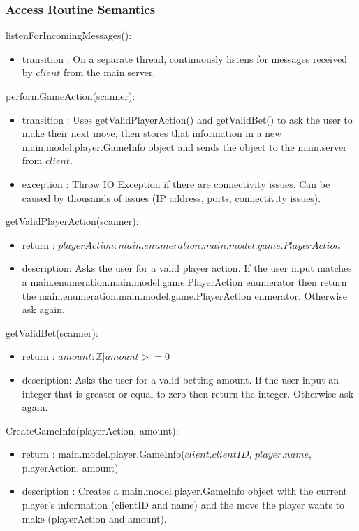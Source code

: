 \documentclass[12pt, titlepage]{article}
\begin{document}
    \subsubsection* {Access Routine Semantics}
    
        \noindent listenForIncomingMessages():
        \begin{itemize}
        \item transition : On a separate thread, continuously listens for messages received by $\mathit{client}$ from the main.server.
        \end{itemize}
        
        \noindent performGameAction(scanner):
        \begin{itemize}
        \item transition : Uses getValidPlayerAction() and getValidBet() to ask the user to make their next move, then stores that information in a new main.model.player.GameInfo object and sends the object to the main.server from $client$.
        \item exception : Throw IO Exception if there are connectivity issues. Can be caused by thousands of issues (IP address, ports, connectivity issues).
        \end{itemize}
        
        \noindent getValidPlayerAction(scanner):
        \begin{itemize}
        \item return : $playerAction : main.enumeration.main.model.game.PlayerAction$
        \item description: Asks the user for a valid player action. If the user input matches a main.enumeration.main.model.game.PlayerAction enumerator then return the main.enumeration.main.model.game.PlayerAction enmerator. Otherwise ask again.
        \end{itemize}
        
        \noindent getValidBet(scanner):
        \begin{itemize}
        \item return : $amount : \mathbb{Z} | amount >= 0$
        \item description: Asks the user for a valid betting amount. If the user input an integer that is greater or equal to zero then return the integer. Otherwise ask again.
        \end{itemize}
        
        \noindent CreateGameInfo(playerAction, amount):
        \begin{itemize}
        \item return : main.model.player.GameInfo($client.clientID$, $player.name$, playerAction, amount)
        \item description : Creates a main.model.player.GameInfo object with the current player's information (clientID and name) and the move the player wants to make (playerAction and amount).
        \end{itemize}
        
\end{document}
